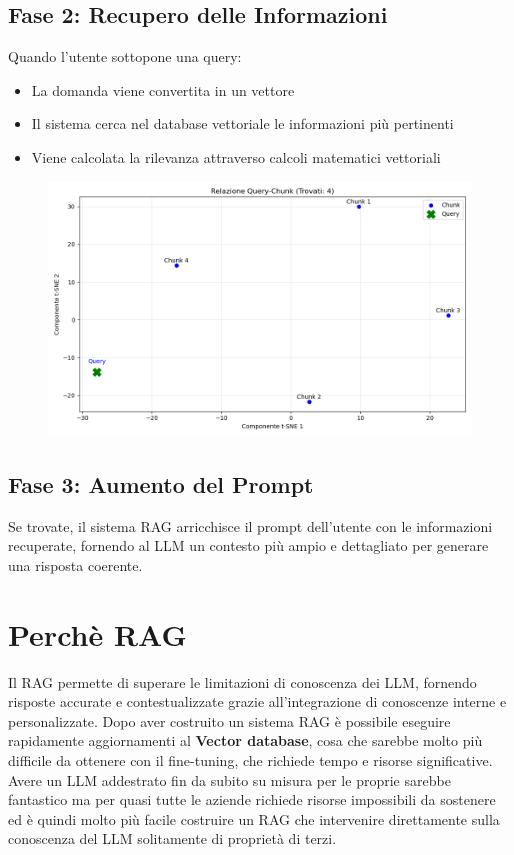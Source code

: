 \documentclass[12pt,a4paper,openright,twoside]{book}
\begin{document}
\subsection{Fase 2: Recupero delle Informazioni}
Quando l'utente sottopone una query:
\begin{itemize}
    \item La domanda viene convertita in un vettore
    \item Il sistema cerca nel database vettoriale le informazioni più pertinenti
    \item Viene calcolata la rilevanza attraverso calcoli matematici vettoriali
\end{itemize}

\begin{figure}[h]
    \raggedright
    \includegraphics[width=0.8\linewidth]{figures/plotSearch.png}
    \label{fig:Emempio distanze chunk e query}
\end{figure}

\subsection{Fase 3: Aumento del Prompt}
Se trovate, il sistema RAG arricchisce il prompt dell'utente con le informazioni recuperate, fornendo al LLM un contesto più ampio e dettagliato per generare una risposta coerente.

\section{Perchè RAG}
Il RAG permette di superare le limitazioni di conoscenza dei LLM, fornendo risposte accurate e contestualizzate 
grazie all'integrazione di conoscenze interne e personalizzate.
Dopo aver costruito un sistema RAG è possibile eseguire rapidamente aggiornamenti al \textbf{Vector database},
cosa che sarebbe molto più difficile da ottenere con il fine-tuning, che richiede tempo e risorse significative.
Avere un LLM addestrato fin da subito su misura per le proprie sarebbe fantastico ma per quasi
tutte le aziende richiede risorse impossibili da sostenere ed è quindi molto più facile costruire un RAG
che intervenire direttamente sulla conoscenza del LLM solitamente di proprietà di terzi.
\end{document}

